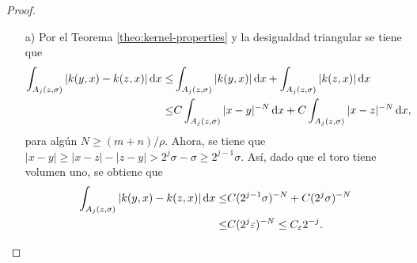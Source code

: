 \begin{proof}
	\begin{itemize}
		\item[a)] Por el Teorema \ref{theo:kernel-properties} y la desigualdad triangular se tiene que 
		\begin{align*}
			\int_{A_j(z, \sigma)} |k(y, x) - k(z, x)|\mathop{}\!\mathrm{d} x \leq &  \int_{A_j(z, \sigma)} |k(y, x)| \mathop{}\!\mathrm{d} x +\int_{A_j(z, \sigma)} |k(z, x)|\mathop{}\!\mathrm{d} x\\
			\leq & C\int_{A_j(z, \sigma)} |x-y|^{-N} \mathop{}\!\mathrm{d} x + C\int_{A_j(z, \sigma)} |x-z|^{-N} \mathop{}\!\mathrm{d} x,
		\end{align*}
		para algún $N\geq (m+n)/\rho$. Ahora, se tiene que $|x-y| \geq |x-z| - |z-y|>2^j\sigma -\sigma \geq 2^{j-1}\sigma$. Así, dado que el toro tiene volumen uno, se obtiene que 
		\begin{align*}
			\int_{A_j(z, \sigma)} |k(y, x) - k(z, x)|\mathop{}\!\mathrm{d} x \leq & C(2^{j-1}\sigma)^{-N}  +  C(2^{j}\sigma)^{-N}  \\
			\leq & C(2^{j} \varepsilon)^{-N} \leq C_\varepsilon 2^{-j}.
		\end{align*}
		

\end{itemize}
\end{proof}

